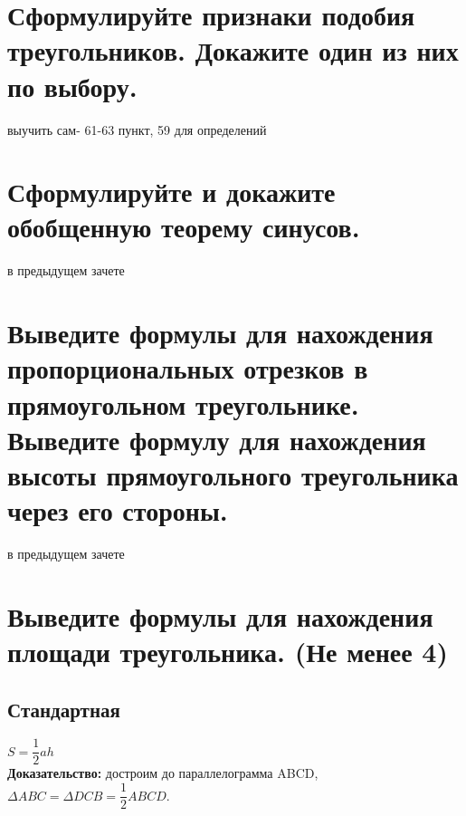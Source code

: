 \documentclass[12pt, letterpaper]{article}
\begin{document}
\section {Сформулируйте признаки подобия треугольников. Докажите один из них по выбору.}
выучить сам- 61-63 пункт, 59 для определений

\section {Сформулируйте и докажите обобщенную теорему синусов.}
в предыдущем зачете

\section {Выведите формулы для нахождения пропорциональных отрезков в прямоугольном треугольнике. Выведите формулу для нахождения высоты прямоугольного треугольника через его стороны.}
в предыдущем зачете

\section {Выведите формулы для нахождения площади треугольника. (Не менее 4)}
\subsection {Стандартная}
$S=\dfrac{1}{2}ah $ \\
\textbf{Доказательство:} достроим до параллелограмма ABCD,\\
$\Delta ABC = \Delta DCB = \dfrac{1}{2}ABCD. $ \\
\end{document}

